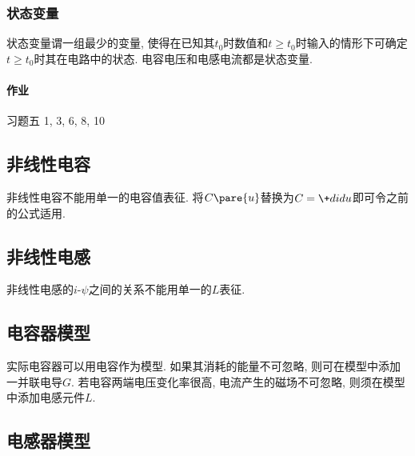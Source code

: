 \documentclass{ctexart}
\begin{document}
\subsubsection{状态变量} %
\label{ssub:状态变量}

状态变量谓一组最少的变量, 使得在已知其$t_0$时数值和$t\ge t_0$时输入的情形下可确定$t\ge t_0$时其在电路中的状态. 电容电压和电感电流都是状态变量.


\paragraph{作业} %
\label{par:作业}

习题五 1, 3, 6, 8, 10



\subsection{非线性电容} %
\label{sub:非线性电容}

非线性电容不能用单一的电容值表征. 将$C\pare{u}$替换为$\displaystyle C = \+didu$即可令之前的公式适用.


\subsection{非线性电感} %
\label{sub:非线性电感}

非线性电感的$i$-$\psi$之间的关系不能用单一的$L$表征.


\subsection{电容器模型} %
\label{sub:电容器模型}

实际电容器可以用电容作为模型. 如果其消耗的能量不可忽略, 则可在模型中添加一并联电导$G$. 若电容两端电压变化率很高, 电流产生的磁场不可忽略, 则须在模型中添加电感元件$L$.


\subsection{电感器模型} %
\label{sub:电感器模型}
\end{document}
